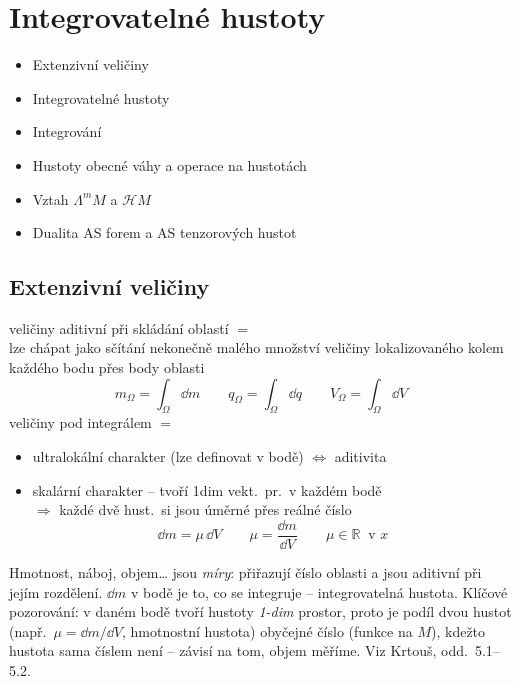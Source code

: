 \section{Integrovatelné hustoty}

\begin{itemize}[nosep]
  \item Extenzivní veličiny
  \item Integrovatelné hustoty
  \item Integrování
  \item Hustoty obecné váhy a operace na hustotách
  \item Vztah $\Lambda^m M$ a $\mathcal{H}M$
  \item Dualita AS forem a AS tenzorových hustot
\end{itemize}

\newpage
{}
\subsection{Extenzivní veličiny}

veličiny aditivní při skládání oblastí $=$  \\
lze chápat jako sčítání nekonečně malého množství veličiny lokalizovaného kolem každého bodu přes body oblasti
\[
  m_\Omega = \int_\Omega \dd m \qquad q_\Omega = \int_\Omega \dd q \qquad V_\Omega = \int_\Omega \dd V
\]
veličiny pod integrálem $=$ 
\begin{itemize}[nosep]
  \item[--] ultralokální charakter (lze definovat v bodě) $\Leftrightarrow$ aditivita
  \item[--] skalární charakter -- tvoří 1dim vekt.\ pr.\ v každém bodě \\
        $\Rightarrow$ každé dvě hust.\ si jsou úměrné přes reálné číslo
        \[ \dd m = \mu\,\dd V \qquad \mu = \frac{\dd m}{\dd V} \qquad \mu\in\mathbb{R}\ \text{ v } x \]
\end{itemize}

\begin{vysvetleni}
Hmotnost, náboj, objem\ldots{} jsou \emph{míry}: přiřazují číslo oblasti a jsou aditivní při jejím rozdělení.
 $\dd m$ v bodě je to, co se integruje -- integrovatelná hustota.
Klíčové pozorování: v daném bodě tvoří hustoty \emph{1-dim} prostor, proto je podíl dvou hustot
(např.\ $\mu = \dd m/\dd V$, hmotnostní hustota) obyčejné číslo (funkce na $M$), kdežto hustota sama číslem není --
závisí na tom,  objem měříme. Viz Krtouš, odd.~5.1--5.2.
\end{vysvetleni}

